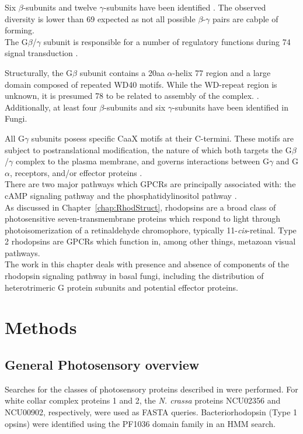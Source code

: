 \indent Six $\beta$-subunits and twelve $\gamma$-subunits have been identified \cite{}. The observed diversity is lower than
 69 expected as not all possible $\beta$-$\gamma$ pairs are cabple of forming.\\

\indent The G$\beta$/$\gamma$ subunit is responsible for a number of regulatory functions during 
 74 signal transduction \cite{Clapham1997}.

\indent Structurally, the G$\beta$ subunit contains a 20aa $\alpha$-helix
 77 region and a large domain composed of repeated WD40 motifs. While the WD-repeat region is unknown, it is presumed
 78 to be related to assembly of the complex. \cite{Clapham1997}.\\

\indent Additionally, at least four $\beta$-subunits and six $\gamma$-subunits have been identified \cite{Hepler1992} in Fungi.

\indent All G$\gamma$ subunits posess specific CaaX motifs at their C-termini. These motifs are subject to 
postranslational modification, the nature of which both targets the G$\beta$/$\gamma$ complex to 
the plasma membrane, and governs interactions between G$\gamma$ and G$\alpha$, receptors, and/or 
effector proteins \cite{Krystofova2005}.\\

\indent There are two major pathways which GPCRs are principally associated with: the cAMP signaling pathway and the phosphatidylinositol pathway \cite{Gilman1987}.\\

\indent As discussed in Chapter~\ref{chap:RhodStruct}, rhodopsins are a broad class of photosensitive 
seven-transmembrane proteins which respond to light through photoisomerization of a retinaldehyde chromophore, 
typically 11-\textit{cis}-retinal. Type 2 rhodopsins are GPCRs which function in, among other things, metazoan visual pathways.\\

\indent The work in this chapter deals with presence and absence of components of the 
rhodopsin signaling pathway in basal fungi, including the distribution of heterotrimeric 
G protein subunits and potential effector proteins.\\

\section{Methods}
\subsection*{General Photosensory overview}
Searches for the classes of photosensory proteins described in \cite{Idnurm2010} were performed. For white collar complex proteins 1 and 2, the \textit{N. crassa} proteins NCU02356 and NCU00902, respectively, were used as FASTA queries. Bacteriorhodopsin (Type 1 opsins) were identified using the PF1036 domain family in an HMM search.\\

